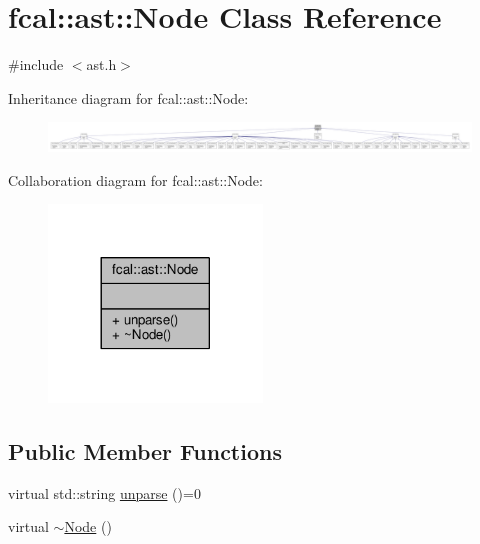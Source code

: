 \hypertarget{classfcal_1_1ast_1_1Node}{}\section{fcal\+:\+:ast\+:\+:Node Class Reference}
\label{classfcal_1_1ast_1_1Node}


{\ttfamily \#include $<$ast.\+h$>$}



Inheritance diagram for fcal\+:\+:ast\+:\+:Node\+:
\nopagebreak
\begin{figure}[H]
\begin{center}
\leavevmode
\includegraphics[width=350pt]{classfcal_1_1ast_1_1Node__inherit__graph}
\end{center}
\end{figure}


Collaboration diagram for fcal\+:\+:ast\+:\+:Node\+:
\nopagebreak
\begin{figure}[H]
\begin{center}
\leavevmode
\includegraphics[width=161pt]{classfcal_1_1ast_1_1Node__coll__graph}
\end{center}
\end{figure}
\subsection*{Public Member Functions}
\begin{DoxyCompactItemize}
\item 
virtual std\+::string \hyperlink{classfcal_1_1ast_1_1Node_a81865f5a1df593708a39bf492952742a}{unparse} ()=0
\item 
virtual \hyperlink{classfcal_1_1ast_1_1Node_a9bc0227b31ced4b51daff34828210639}{$\sim$\+Node} ()
\end{DoxyCompactItemize}


